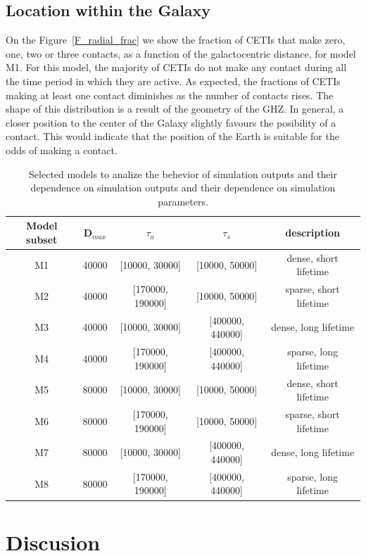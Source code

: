 \documentclass[crop]{CSLB}%
\begin{document}
\subsection{Location within the Galaxy}\label{SS_location}
    
On the Figure~\ref{F_radial_frac} we show the fraction of CETIs that make
zero, one, two or three contacts, as a function of the galactocentric
distance, for model M1.
%
For this model, the majority of CETIs do not
make any contact during all the time period in which they are active.
%
As expected, the fractions of CETIs making at least one contact
diminishes as the number of contacts rises.
%
The shape of this distribution is a result of the geometry of the GHZ.
%
In general, a closer position to the center of the Galaxy slightly favours 
the posibility of a contact.
%
This would indicate that the position of the Earth is suitable for the
odds of making a contact.


\setlength{\tabcolsep}{10pt}
\begin{table}
\centering
\begin{tabular}{ccccc}
\hline
Model subset & D$_{max}$ & $\tau_a$ & $\tau_s$ & description  \\
\hline
M1 & 40000 & [10000, 30000]   & [10000, 50000]   &dense, short lifetime\\
M2 & 40000 & [170000, 190000] & [10000, 50000]   &sparse, short lifetime\\
M3 & 40000 & [10000, 30000]   & [400000, 440000] &dense, long lifetime \\
M4 & 40000 & [170000, 190000] & [400000, 440000] &sparse, long lifetime\\
%
M5 & 80000 & [10000, 30000]   & [10000, 50000]   &dense, short lifetime\\
M6 & 80000 & [170000, 190000] & [10000, 50000]   &sparse, short lifetime\\
M7 & 80000 & [10000, 30000]   & [400000, 440000] &dense, long lifetime \\
M8 & 80000 & [170000, 190000] & [400000, 440000] &sparse, long lifetime\\
%
\hline
\end{tabular}
\caption{Selected models to analize the behevior of simulation outputs
   and their dependence on simulation outputs and their dependence on
   simulation parameters.}
\label{T_selected_models}
\end{table}


\section{Discusion}\label{S_discussion}
\end{document}
